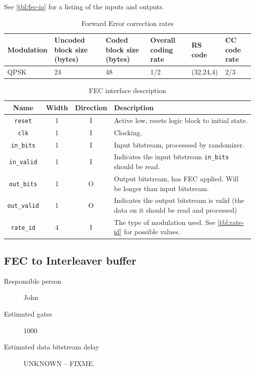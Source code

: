 \documentclass[dvips,10pt,twocolumn]{article}
\newcommand{\wire}{\texttt}
\begin{document}
See \autoref{tbl:fec-io} for a listing of the inputs and outputs.

\begin{table}
	\begin{tabularx}{\textwidth}{X|X|X|X|X|X}
	\label{tbl:fec-param}
		Modulation & Uncoded block size (bytes) &
		Coded block size (bytes) & Overall coding
		rate & RS code & CC code rate \\ \hline
		QPSK & 24 & 48 & 1/2 & (32,24,4) & 2/3 \\
	\end{tabularx}
	\caption{Forward Error correction rates}
\end{table}

\begin{table} \begin{tabularx}{\textwidth}{c|c|c|X}
	\label{tbl:fec-io}
	Name & Width & Direction & Description \\ \hline

	\wire{reset} & 1 & I & Active low, resets logic block to initial
	state. \\

	\wire{clk}   & 1 & I & Clocking. \\

	\wire{in\_bits} & 1 & I & Input bitstream, processsed by randomizer.
	\\

	\wire{in\_valid} & 1 & I & Indicates the input bitstream
	\wire{in\_bits} should be read.\\

	\wire{out\_bits} & 1 & O & Output bitstream, has FEC
	applied. Will be longer than input bitstream. \\

	\wire{out\_valid} & 1 & O & Indicates the output bitstream
	is valid (the data on it should be read and processed) \\

	\wire{rate\_id} & 4 & I & The type of modulation used. See
	\autoref{tbl:rate-id} for possible values.

\end{tabularx} \caption{FEC interface description} \end{table}


\subsection{FEC to Interleaver buffer}
\label{sec:fec_buffer}
\begin{description}
	\item[Responsible person] John 
	\item[Estimated gates] 1000
	\item[Estimated data bitstream delay] UNKNOWN -- FIXME.
\end{description}
\end{document}
